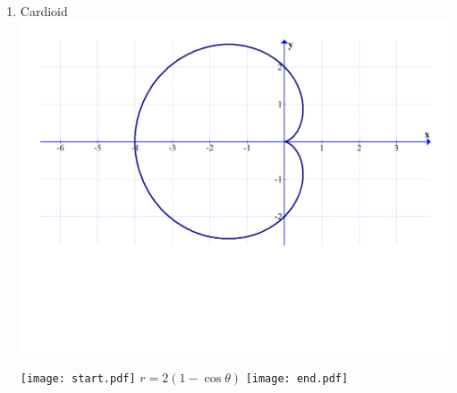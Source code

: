 \documentclass[12pt]{article}
\begin{document}
\begin{enumerate}
\item Cardioid\\
\includegraphics[scale=0.35]{graph3.pdf}

\texttt{[image: start.pdf]}
{{$r=2(1-\cos{\theta})$}}
\texttt{[image: end.pdf]}


\end{enumerate}

\newpage

\end{document}
